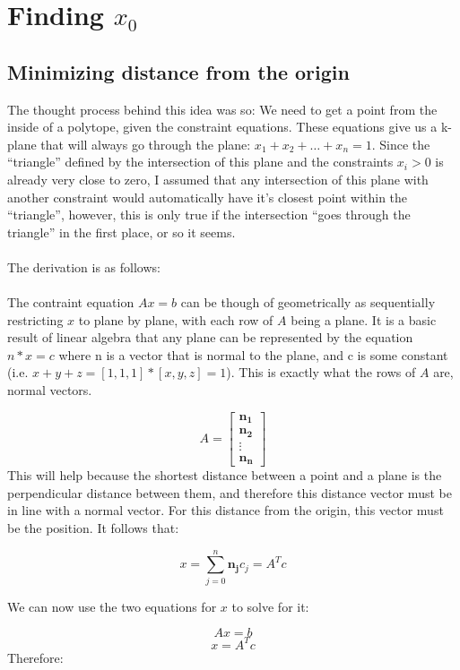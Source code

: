\documentclass{article}\usepackage{graphicx, color}
\begin{document}
\newpage
\section{Finding $x_0$}
\subsection*{Minimizing distance from the origin}

The thought process behind this idea was so: We need to get a point
from the inside of a polytope, given the constraint equations. These
equations give us a k-plane that will always go through the plane:
$x_1 + x_2 + \dots + x_n = 1$. Since the ``triangle'' defined by the
intersection of this plane and the constraints $x_i > 0$ is already
very close to zero, I assumed that any intersection of this plane with
another constraint would automatically have it's closest point within
the ``triangle'', however, this is only true if the intersection
``goes through the triangle'' in the first place, or so it seems.
\\ \\
\noindent The derivation is as follows:
\\ \\
\noindent The contraint equation $Ax=b$ can be though of geometrically
as sequentially restricting $x$ to plane by plane, with each row of
$A$ being a plane. It is a basic result of linear algebra that any
plane can be represented by the equation $ n * x = c$ where n is a
vector that is normal to the plane, and c is some constant
(i.e. $x+y+z = [1,1,1] * [x,y,z] = 1$). This is exactly what the rows
of $A$ are, normal vectors.

$$ A = \begin{bmatrix}\mathbf{n_1} \\\mathbf{n_2} \\ \vdots \\ \mathbf{n_n} \end{bmatrix} $$
\noindent
This will help because the shortest distance between a point and a
plane is the perpendicular distance between them, and therefore this
distance vector must be in line with a normal vector. For this
distance from the origin, this vector must be the position. It follows
that:

$$ x = \sum_{j=0}^n \mathbf{n_j}c_j = A^T c$$

\noindent
We can now use the two equations for $x$ to solve for it:

$$ A x = b$$
$$ x = A^Tc$$
Therefore:
\end{document}
